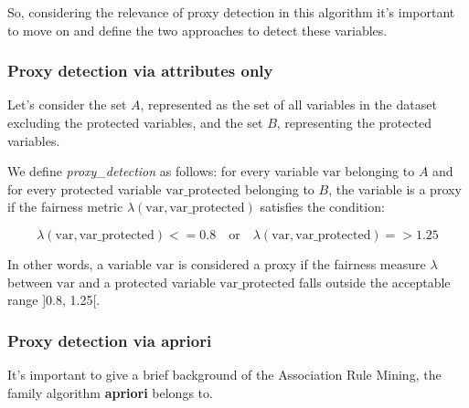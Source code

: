 \documentclass[12pt,a4paper,openright,twoside]{book}
\begin{document}
So, considering the relevance of proxy detection in this algorithm it's important to move on and define the two approaches to detect these variables. \\

\subsubsection{Proxy detection via attributes only}
Let's consider the set \( A \), represented as the set of all variables in the dataset excluding the protected variables, and the set \( B \), representing the protected variables.

We define \textit{proxy\_detection} as follows: for every variable \( \text{var} \) belonging to \( A \) and for every protected variable \( \text{var\_protected} \) belonging to \( B \), the variable is a proxy if the fairness metric \( \lambda(\text{var}, \text{var\_protected}) \) satisfies the condition:

\[
\lambda(\text{var}, \text{var\_protected}) <= 0.8 \quad \text{or} \quad \lambda(\text{var}, \text{var\_protected}) => 1.25
\]

In other words, a variable \( \text{var} \) is considered a proxy if the fairness measure \( \lambda \) between \( \text{var} \) and a protected variable \( \text{var\_protected} \) falls outside the acceptable range ]0.8, 1.25[. \\

\subsubsection{Proxy detection via apriori}
It's important to give a brief background of the Association Rule Mining, the family algorithm \textbf{apriori} belongs to.
\end{document}
